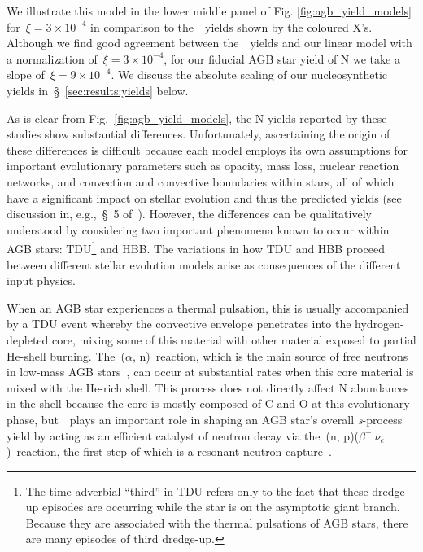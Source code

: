 \documentclass[ms.tex]{subfiles}
\begin{document}
We illustrate this model in the lower middle panel of Fig.
\ref{fig:agb_yield_models} for~$\xi = 3\times10^{-4}$ in comparison to
the~\cristallo~yields shown by the coloured X's.
Although we find good agreement between the~\cristallo~yields and our linear
model with a normalization of~$\xi = 3\times10^{-4}$, for our fiducial AGB star
yield of N we take a slope of~$\xi = 9\times10^{-4}$.
We discuss the absolute scaling of our nucleosynthetic yields
in~\S~\ref{sec:results:yields} below.
\par
As is clear from Fig.~\ref{fig:agb_yield_models}, the N yields reported by
these studies show substantial differences.
Unfortunately, ascertaining the origin of these differences is difficult
because each model employs its own assumptions for important evolutionary
parameters such as opacity, mass loss, nuclear reaction networks, and
convection and convective boundaries within stars, all of which have a
significant impact on stellar evolution and thus the predicted yields (see
discussion in, e.g.,~\S~5 of~\citealp{Karakas2016}).
However, the differences can be qualitatively understood by considering two
important phenomena known to occur within AGB stars: TDU\footnote{
	The time adverbial ``third'' in TDU refers only to the fact that these
	dredge-up episodes are occurring while the star is on the asymptotic giant
	branch. Because they are associated with the thermal pulsations of AGB
	stars, there are many episodes of third dredge-up.
} and HBB.
The variations in how TDU and HBB proceed between different stellar evolution
models arise as consequences of the different input physics.
\par
When an AGB star experiences a thermal pulsation, this is usually accompanied
by a TDU event whereby the convective envelope penetrates into the
hydrogen-depleted core, mixing some of this material with other material
exposed to partial He-shell burning.
The~\Cthirteen($\alpha$, n)\Osixteen~reaction, which is the main source of free
neutrons in low-mass AGB stars~\citep{Gallino1998}, can occur at substantial
rates when this core material is mixed with the He-rich shell.
This process does not directly affect N abundances in the shell because the
core is mostly composed of C and O at this evolutionary phase,
but~\Nfourteen~plays an important role in shaping an AGB star's overall
\textit{s}-process yield by acting as an efficient catalyst of neutron decay
via the~\Nfourteen(n, p)\Cfourteen($\beta^+~\nu_{e}$)\Nfourteen~reaction, the
first step of which is a resonant neutron capture~\citep{Cristallo2011}.
\par
\end{document}
